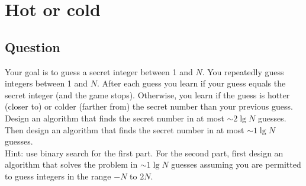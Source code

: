 \section{Hot or cold}

\subsection*{Question}
Your goal is to guess a secret integer between 1 and $N$. You repeatedly 
guess integers between 1 and $N$. After each guess you learn if your guess equals the
secret integer (and the game stops). Otherwise, you learn if the guess is hotter (closer to)
or colder (farther from) the secret number than your previous guess. Design an algorithm
that finds the secret number in at most $\sim 2\lg{N}$ guesses. Then design an algorithm
that finds the secret number in at most $\sim 1\lg{N}$ guesses.\\
Hint: use binary search for the first part. For the second part, first design an algorithm
that solves the problem in $\sim 1\lg{N}$ guesses assuming you are permitted to guess integers in
the range $-N$ to $2N$.

